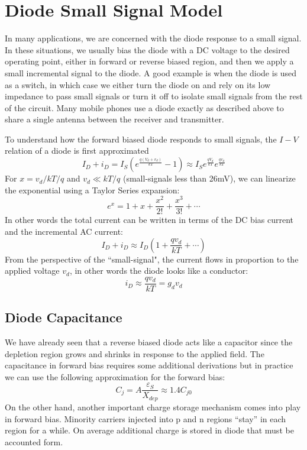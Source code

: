 \section{Diode Small Signal Model}
In many applications, we are concerned with the diode response to a small signal.  In these situations, we usually bias the diode with a DC voltage to the desired operating point, either in forward or reverse biased region, and then we apply a small incremental signal to the diode.  A good example is when the diode is used as a switch, in which case we either turn the diode on and rely on its low impedance to pass small signals or turn it off to isolate small signals from the rest of the circuit. Many mobile phones use a diode exactly as described above to share a single antenna between the receiver and transmitter.  

To understand how the forward biased diode responds to small signals, the $I-V$ relation of a diode is first approximated
\begin{equation}
	{I_D} + {i_D} = {I_S}\left( {{e^{\frac{{q({V_d} + {v_d})}}{{kT}}}} - 1} \right) \approx 
{I_S}{e^{\frac{{q{V_d}}}{{kT}}}}{e^{\frac{{q{v_d}}}{{kT}}}}
\end{equation}
For $x = v_d/kT/q$ and $v_d \ll kT/q$ (small-signals less than 26mV),  we can linearize the exponential using a Taylor Series expansion:
\begin{equation}
	{e^x} = 1 + x + \frac{{{x^2}}}{{2!}} + \frac{{{x^3}}}{{3!}} +  \cdots 
\end{equation}
In other words the total current can be written in terms of the DC bias current and the incremental AC current:
\begin{equation}
	{I_D} + {i_D} \approx {I_D}\left( {1 + \frac{{q{v_d}}}{{kT}} +  \cdots } \right)
\end{equation}
From the perspective of the ``small-signal", the current flows in proportion to the applied voltage $v_d$, in other words the diode looks like a conductor:
\begin{equation}
	{i_D} \approx \frac{{q{v_d}}}{{kT}} = {g_d}{v_d}
\end{equation}
\subsection{Diode Capacitance}
We have already seen that a reverse biased diode acts like a capacitor since the depletion region grows and shrinks in response to the applied field.  The capacitance in forward bias requires some additional derivations but in practice we can use the following approximation for the forward bias:
\begin{equation}
	{C_j} = A\frac{{{\varepsilon _S}}}{{{X_{dep}}}} \approx 1.4C_{j0}
\end{equation}
On the other hand, another important charge storage mechanism comes into play in forward bias.   Minority carriers injected into p and n regions “stay” in each region for a while.   On average additional charge is stored in diode that must be accounted form.
